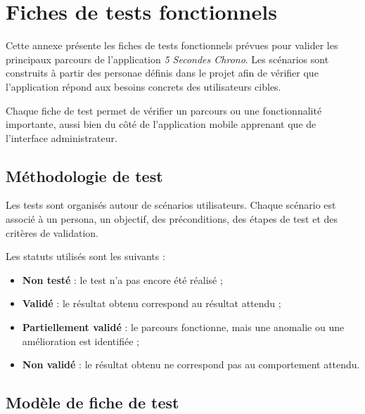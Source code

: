 \chapter{Fiches de tests fonctionnels}

Cette annexe présente les fiches de tests fonctionnels prévues pour valider les principaux parcours de l'application \emph{5 Secondes Chrono}. 
Les scénarios sont construits à partir des personae définis dans le projet afin de vérifier que l'application répond aux besoins concrets des utilisateurs cibles.

Chaque fiche de test permet de vérifier un parcours ou une fonctionnalité importante, aussi bien du côté de l'application mobile apprenant que de l'interface administrateur.

\section{Méthodologie de test}

Les tests sont organisés autour de scénarios utilisateurs. Chaque scénario est associé à un persona, un objectif, des préconditions, des étapes de test et des critères de validation.

Les statuts utilisés sont les suivants :

\begin{itemize}
    \item \textbf{Non testé} : le test n'a pas encore été réalisé ;
    \item \textbf{Validé} : le résultat obtenu correspond au résultat attendu ;
    \item \textbf{Partiellement validé} : le parcours fonctionne, mais une anomalie ou une amélioration est identifiée ;
    \item \textbf{Non validé} : le résultat obtenu ne correspond pas au comportement attendu.
\end{itemize}

\section{Modèle de fiche de test}

\begingroup
\small
\renewcommand{\arraystretch}{1.3}
\setlength{\LTleft}{\fill}
\setlength{\LTright}{\fill}

